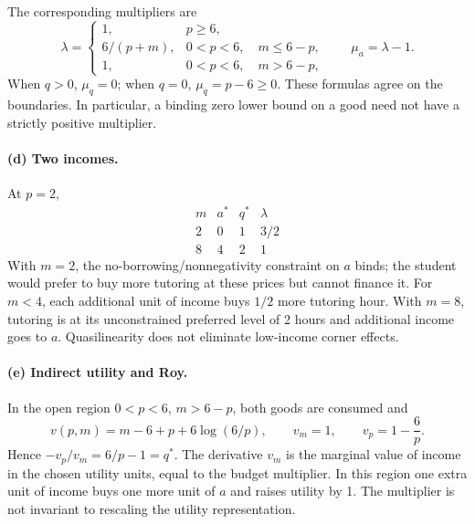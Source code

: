 The corresponding multipliers are
\[
 \lambda=
 \begin{cases}
 1,&p\ge6,\\
 6/(p+m),&0<p<6,\quad m\le6-p,\\
 1,&0<p<6,\quad m>6-p,
 \end{cases}\qquad
 \mu_a=\lambda-1.
\]
When $q>0$, $\mu_q=0$; when $q=0$, $\mu_q=p-6\ge0$. These formulas agree on the boundaries. In particular, a binding zero lower bound on a good need not have a strictly positive multiplier.
\paragraph{(d) Two incomes.} At $p=2$,
\[
 \begin{array}{c|ccc}
 m&a^*&q^*&\lambda\\\hline
 2&0&1&3/2\\
 8&4&2&1
 \end{array}
\]
With $m=2$, the no-borrowing/nonnegativity constraint on $a$ binds; the student would prefer to buy more tutoring at these prices but cannot finance it. For $m<4$, each additional unit of income buys $1/2$ more tutoring hour. With $m=8$, tutoring is at its unconstrained preferred level of 2 hours and additional income goes to $a$. Quasilinearity does not eliminate low-income corner effects.
\paragraph{(e) Indirect utility and Roy.} In the open region $0<p<6$, $m>6-p$, both goods are consumed and
\[
 v(p,m)=m-6+p+6\log(6/p),\qquad
 v_m=1,\qquad v_p=1-\frac6p.
\]
Hence $-v_p/v_m=6/p-1=q^*$. The derivative $v_m$ is the marginal value of income in the chosen utility units, equal to the budget multiplier. In this region one extra unit of income buys one more unit of $a$ and raises utility by 1. The multiplier is not invariant to rescaling the utility representation.

